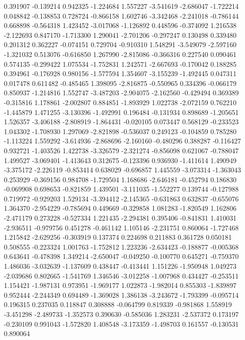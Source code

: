 0.391907
-0.139214
0.942325
-1.224684
1.557227
-3.541619
-2.686047
-1.722214
0.048842
-0.138853
0.728724
-0.866158
1.602746
-3.342468
-2.241018
-0.786144
0.668898
-0.564318
1.423452
-3.017068
-1.126892
0.448596
-0.374092
1.216538
-2.122693
0.847170
-1.713300
1.290041
-2.701206
-0.297247
0.130498
0.339480
0.201312
0.362227
-0.074151
0.729704
-0.910310
1.548291
-3.549079
-2.597160
-1.321032
0.513076
-0.616850
1.267990
-2.815086
-0.366316
0.227540
0.090461
0.574135
-0.299422
1.075534
-1.752831
1.242571
-2.667693
-0.170042
0.188285
0.394961
-0.176928
0.980156
-1.577594
1.354607
-3.155239
-1.492445
0.047311
0.017478
0.611482
-0.485465
1.398095
-2.816875
-0.550965
0.334396
-0.066179
0.850937
-1.214816
1.552747
-3.487203
-2.904075
-2.162560
-0.429494
0.369389
-0.315816
1.178861
-2.002807
0.884851
-1.893929
1.022738
-2.072159
0.762210
-1.445879
1.471255
-3.130396
-1.492991
0.196484
-0.131934
0.898689
-1.205651
1.526357
-3.406188
-2.808919
-1.864431
-0.020105
0.073447
0.568129
-0.233523
1.043302
-1.708930
1.297069
-2.821898
-0.536037
0.249123
-0.104859
0.785280
-1.113224
1.559292
-3.614936
-2.868696
-2.160160
-0.480296
0.388287
-0.116427
0.932721
-1.403526
1.422738
-3.326579
-2.321274
-0.856098
0.621067
-0.788047
1.499527
-3.069401
-1.413643
0.312675
-0.123396
0.936930
-1.411614
1.490949
-3.375172
-2.226119
-0.853414
0.638029
-0.696857
1.445559
-3.073314
-1.363043
0.253929
-0.369156
0.984708
-1.729504
1.168686
-2.646181
-0.452794
0.186830
-0.069908
0.698653
-0.821859
1.439501
-3.111035
-1.552277
0.139744
-0.127988
0.719972
-0.929203
1.529134
-3.394412
-2.145365
-0.631863
0.632837
-0.655076
1.364370
-2.954229
-0.785694
0.449669
-0.329858
1.081283
-1.820549
1.162806
-2.471179
0.273228
-0.527334
1.221435
-2.294381
0.395406
-0.841831
1.410031
-2.936511
-0.979756
0.451278
-0.461142
1.105146
-2.231751
0.860064
-1.727468
1.215842
-2.629256
-0.303919
0.137374
0.224698
0.211883
0.361728
0.050181
0.508555
-0.223324
1.001763
-1.752812
1.223236
-2.634423
-0.188877
-0.005368
0.643641
-0.478398
1.349214
-2.650047
-0.049250
-0.100770
0.645271
-0.759370
1.486036
-3.032639
-1.137609
0.438447
-0.413441
1.151226
-1.950948
1.049273
-2.039686
0.802665
-1.541769
1.346546
-3.012258
-1.007968
0.434427
-0.253511
1.154421
-1.987131
0.973951
-1.969177
1.022873
-1.982014
0.855303
-1.839897
0.952444
-2.244349
0.694489
-1.369028
1.386138
-3.243672
-1.793399
-0.095714
0.196315
0.237035
0.118847
0.308888
-0.064799
0.819339
-0.981868
1.558919
-3.451298
-2.489733
-1.352573
0.390630
-0.585036
1.283231
-2.537372
0.173197
-0.230109
0.991043
-1.572820
1.408548
-3.173359
-1.498703
0.161557
-0.130531
0.890064
